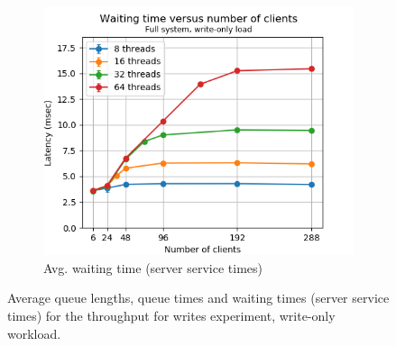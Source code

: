 \documentclass[11pt,a4paper]{article}
\begin{document}
\begin{figure}[h]
\begin{subfigure}{.33\textwidth}
  \centering
  \includegraphics[width=1.0\linewidth,trim={0px 0px 0px 0px},clip]{img/plot/tpfw-wtime_mw.png}
  \caption{Avg. waiting time (server service times)}
  \label{fig:tpfw-wtime_mw}
\end{subfigure}
\caption{Average queue lengths, queue times and waiting times (server service times) for the throughput for writes experiment, write-only workload.}
\label{fig:tpfw_stats_mw}
\end{figure}
\end{document}
